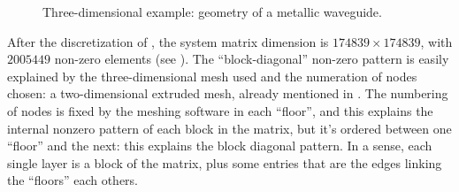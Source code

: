 \begin{figure}[htbp]
  \begin{center}
    \resizebox{6cm}{!}{}
  \end{center}
  \caption{Three-dimensional example: geometry of a metallic waveguide.}
  \label{fig:simple_waveguide_geom}
\end{figure}

After the discretization of , the
system matrix dimension is $174839 \times 174839$, with $2005449$
non-zero elements (see ). The
``block-diagonal'' non-zero pattern is easily explained by the
three-dimensional mesh used and the numeration of nodes chosen: a
two-dimensional extruded mesh, already mentioned in
. The numbering of nodes is fixed by the
meshing software \cite{triangle} in each ``floor'', and this explains
the internal nonzero pattern of each block in the matrix, but it's
ordered between one ``floor'' and the next: this explains the block
diagonal pattern. In a sense, each single layer is a block of the
matrix, plus some entries that are the edges linking the ``floors''
each others.


